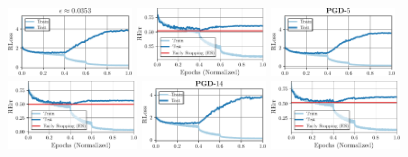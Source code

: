 \begin{figure}[t]
	\centering
	\begin{minipage}[t]{0.19\textwidth}
		\vspace*{0px}
		
		\includegraphics[height=1.8cm]{plots_supp_training_curves_eps_loss}
		
		\hspace*{-0.25cm}
		\includegraphics[height=1.8cm]{plots_supp_training_curves_eps_error}
	\end{minipage}
	\begin{minipage}[t]{0.19\textwidth}
		\vspace*{0px}
		
		\includegraphics[height=1.8cm]{plots_supp_training_curves_i5_loss}
		
		\hspace*{-0.25cm}
		\includegraphics[height=1.8cm]{plots_supp_training_curves_i5_error}
	\end{minipage}
	\begin{minipage}[t]{0.19\textwidth}
		\vspace*{0px}
		
		\includegraphics[height=1.8cm]{plots_supp_training_curves_i14_loss}
		
		\hspace*{-0.25cm}
		\includegraphics[height=1.8cm]{plots_supp_training_curves_i14_error}
	\end{minipage}
	\begin{minipage}[t]{0.19\textwidth}
		\vspace*{0px}
		

\end{minipage}
\end{figure}
